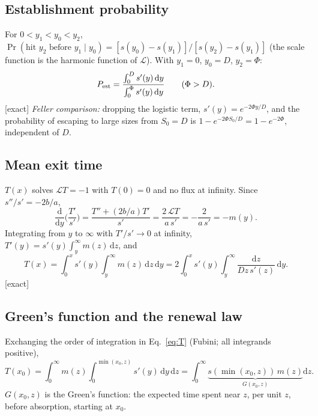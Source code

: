 \documentclass[11pt]{article}
\newcommand{\dd}{\mathrm d}
\newcommand{\exact}{\textsf{\small[exact]}}
\begin{document}
\subsection{Establishment probability}

For $0<y_1<y_0<y_2$, $\Pr(\text{hit }y_2\text{ before }y_1\mid y_0)=[s(y_0)-s(y_1)]/[s(y_2)-s(y_1)]$ (the scale function is
the harmonic function of $\mathcal L$).  With $y_1=0$, $y_0=D$, $y_2=\Phi$:
\begin{equation}
P_{\rm est}=\frac{\int_0^Ds'(y)\,\dd y}{\int_0^\Phi s'(y)\,\dd y}\qquad(\Phi>D).
\end{equation}
\exact{}  \emph{Feller comparison:} dropping the logistic term, $s'(y)=e^{-2\Phi y/D}$, and the probability of
escaping to large sizes from $S_0=D$ is $1-e^{-2\Phi S_0/D}=1-e^{-2\Phi}$, independent of $D$.

\subsection{Mean exit time}

$T(x)$ solves $\mathcal LT=-1$ with $T(0)=0$ and no flux at infinity.  Since $s''/s'=-2b/a$,
\begin{equation}
\frac{\dd}{\dd y}\Big(\frac{T'}{s'}\Big)=\frac{T''+(2b/a)T'}{s'}=\frac{2\,\mathcal LT}{a\,s'}=-\frac{2}{a\,s'}=-m(y).
\end{equation}
Integrating from $y$ to $\infty$ with $T'/s'\to0$ at infinity, $T'(y)=s'(y)\int_y^\infty m(z)\,\dd z$, and
\begin{equation}
T(x)=\int_0^xs'(y)\int_y^\infty m(z)\,\dd z\,\dd y=2\int_0^xs'(y)\int_y^\infty\frac{\dd z}{Dz\,s'(z)}\,\dd y .
\label{eq:T}
\end{equation}
\exact

\subsection{Green's function and the renewal law}

Exchanging the order of integration in Eq.~\eqref{eq:T} (Fubini; all integrands positive),
\begin{equation}
T(x_0)=\int_0^\infty m(z)\int_0^{\min(x_0,z)}s'(y)\,\dd y\,\dd z=\int_0^\infty\underbrace{s(\min(x_0,z))\,m(z)}_{G(x_0,z)}\dd z .
\end{equation}
$G(x_0,z)$ is the Green's function: the expected time spent near $z$, per unit $z$, before absorption, starting at $x_0$.
\end{document}
